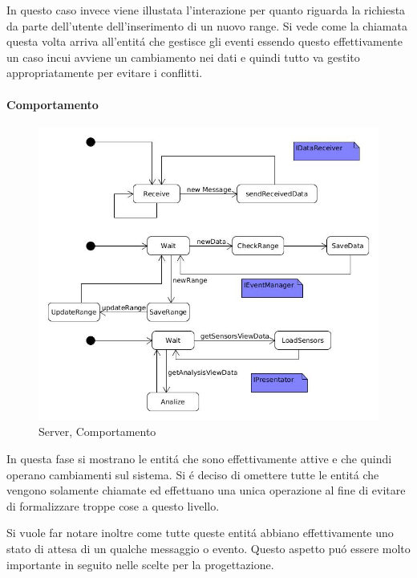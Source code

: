 In questo caso invece viene illustata l'interazione per quanto riguarda la richiesta da parte dell'utente dell'inserimento di un nuovo range. Si vede come la chiamata questa volta arriva all'entit\'a che gestisce gli eventi essendo questo effettivamente un caso incui avviene un cambiamento nei dati e quindi tutto va gestito appropriatamente per evitare i conflitti.

\paragraph{Comportamento}

\begin{figure}[H]
\centering
\includegraphics[width=\textwidth]{Figures/DomainModel/Server/Behaviour.jpg}
\caption{Server, Comportamento}
\end{figure}


In questa fase si mostrano le entit\'a che sono effettivamente attive e che quindi operano cambiamenti sul sistema. Si \'e deciso di omettere tutte le entit\'a che vengono solamente chiamate ed effettuano una unica operazione al fine di evitare di formalizzare troppe cose a questo livello.

Si vuole far notare inoltre come tutte queste entit\'a abbiano effettivamente uno stato di attesa di un qualche messaggio o evento. Questo aspetto pu\'o essere molto importante in seguito nelle scelte per la progettazione.

\newpage

